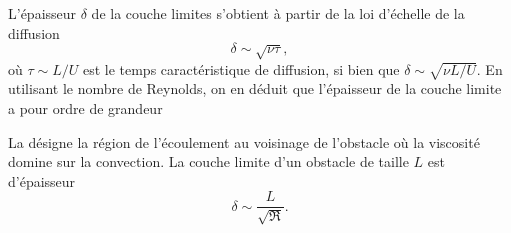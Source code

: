 \documentclass[12pt,fancy]{cours}
\begin{document}
 L’épaisseur $\delta$ de la couche limites s’obtient à partir de la loi d’échelle de la diffusion
 \begin{equation}
	\delta \sim \sqrt{\nu \tau},
 \end{equation} 
 où $\tau \sim L/U$ est le temps caractéristique de diffusion,  si bien que $\delta\sim \sqrt{\nu L/U}$. En utilisant le nombre de Reynolds, on en déduit que l'épaisseur de la couche limite a pour ordre de grandeur

\begin{definition}\label{def:couche_lim}
	La  désigne la région de l'écoulement au voisinage de l’obstacle où la viscosité domine sur la convection. La couche limite d’un obstacle de taille $L$ est d’épaisseur 
	$$
	\delta\sim \frac{L}{\sqrt{\Re}}.
	$$
	\end{definition}
\end{document}
